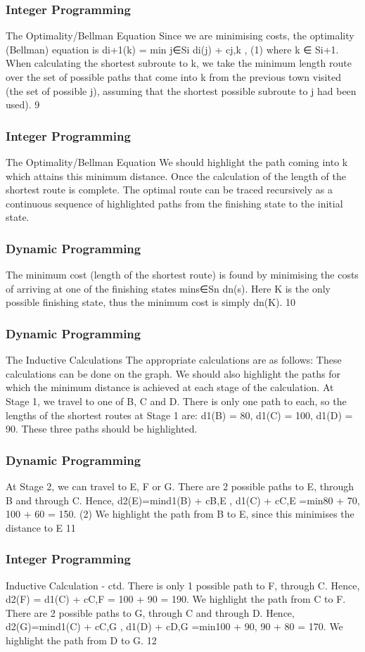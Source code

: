 \begin{frame} 
\frametitle{Integer Programming}     
The Optimality/Bellman Equation
Since we are minimising costs, the optimality (Bellman) equation is
di+1(k) = min
j∈Si
{di(j) + cj,k }, (1)
where k ∈ Si+1.
When calculating the shortest subroute to k, we take the minimum
length route over the set of possible paths that come into k from
the previous town visited (the set of possible j), assuming that the
shortest possible subroute to j had been used).
9 \end{frame}  
\begin{frame} 
	\frametitle{Integer Programming}     
The Optimality/Bellman Equation
We should highlight the path coming into k which attains this
minimum distance. Once the calculation of the length of the
shortest route is complete. The optimal route can be traced
recursively as a continuous sequence of highlighted paths from the
finishing state to the initial state.
\end{frame}  
\begin{frame} 
	\frametitle{Dynamic Programming} 
The minimum cost (length of the shortest route) is found by
minimising the costs of arriving at one of the finishing states
mins∈Sn dn(s). Here K is the only possible finishing state, thus the
minimum cost is simply dn(K).
10 
\end{frame}  
\begin{frame} 
\frametitle{Dynamic Programming}     
The Inductive Calculations
The appropriate calculations are as follows: These calculations can
be done on the graph. We should also highlight the paths for which
the minimum distance is achieved at each stage of the calculation.
At Stage 1, we travel to one of B, C and D. There is only one
path to each, so the lengths of the shortest routes at Stage 1 are:
d1(B) = 80, d1(C) = 100, d1(D) = 90. These three paths should
be highlighted.
\end{frame}  
\begin{frame} 
	\frametitle{Dynamic Programming} 
At Stage 2, we can travel to E, F or G. There are 2 possible paths
to E, through B and through C. Hence,
d2(E)=min{d1(B) + cB,E , d1(C) + cC,E }
=min{80 + 70, 100 + 60} = 150. (2)
We highlight the path from B to E, since this minimises the
distance to E
11 
\end{frame}  
\begin{frame} 
\frametitle{Integer Programming}     
Inductive Calculation - ctd.
There is only 1 possible path to F, through C. Hence,
d2(F) = d1(C) + cC,F = 100 + 90 = 190.
We highlight the path from C to F.
There are 2 possible paths to G, through C and through D. Hence,
d2(G)=min{d1(C) + cC,G , d1(D) + cD,G }
=min{100 + 90, 90 + 80} = 170.
We highlight the path from D to G.
12 
\end{frame}  
